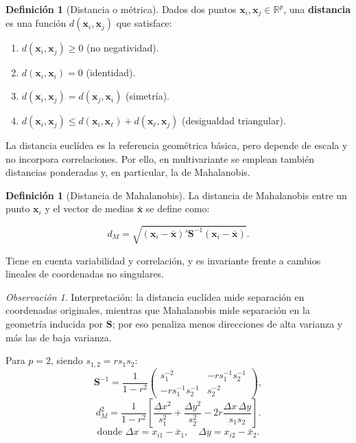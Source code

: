 \documentclass[12pt, a4paper]{article}
\theoremstyle{plain}
\theoremstyle{definition}
\newtheorem{definicion}[teorema]{Definición}
\theoremstyle{remark}
\newtheorem*{observacion}{Observación}
\newcommand{\R}{\mathbb{R}}
\newcommand{\mat}[1]{\mathbf{#1}}
\begin{document}
\begin{definicion}[Distancia o métrica]
Dados dos puntos $\mathbf{x}_i, \mathbf{x}_j\in\R^p$, una \textbf{distancia} es
una función $d(\mathbf{x}_i,\mathbf{x}_j)$ que satisface:
\begin{enumerate}
  \item $d(\mathbf{x}_i,\mathbf{x}_j)\ge0$ (no negatividad).
  \item $d(\mathbf{x}_i,\mathbf{x}_i)=0$ (identidad).
  \item $d(\mathbf{x}_i,\mathbf{x}_j)=d(\mathbf{x}_j,\mathbf{x}_i)$ (simetría).
  \item $d(\mathbf{x}_i,\mathbf{x}_j)\le d(\mathbf{x}_i,\mathbf{x}_\ell)+d(\mathbf{x}_\ell,\mathbf{x}_j)$ (desigualdad triangular).
\end{enumerate}
\end{definicion}

La distancia euclídea es la referencia geométrica básica, pero depende de
escala y no incorpora correlaciones. Por ello, en multivariante se emplean
también distancias ponderadas y, en particular, la de Mahalanobis.

\begin{definicion}[Distancia de Mahalanobis]
La distancia de Mahalanobis entre un punto $\mathbf{x}_i$ y el vector de
medias $\bar{\mathbf{x}}$ se define como:
\begin{mdframed}[style=resultado]
\[
  d_M = \sqrt{(\mathbf{x}_i-\bar{\mathbf{x}})'\mat{S}^{-1}(\mathbf{x}_i-\bar{\mathbf{x}})}.
\]
\end{mdframed}
Tiene en cuenta variabilidad y correlación, y es invariante frente a cambios
lineales de coordenadas no singulares.
\end{definicion}

\begin{observacion}
Interpretación: la distancia euclídea mide separación en coordenadas
originales, mientras que Mahalanobis mide separación en la geometría inducida
por $\mat{S}$; por eso penaliza menos direcciones de alta varianza y más las de
baja varianza.
\end{observacion}

Para $p=2$, siendo $s_{1,2}=rs_1s_2$:
\[
  \mat{S}^{-1} = \frac{1}{1-r^2}
  \begin{pmatrix}s_1^{-2}&-rs_1^{-1}s_2^{-1}\\-rs_1^{-1}s_2^{-1}&s_2^{-2}\end{pmatrix},
\]
\[
  d_M^2 = \frac{1}{1-r^2}\left[
    \frac{\Delta x^2}{s_1^2} + \frac{\Delta y^2}{s_2^2}
    - 2r\frac{\Delta x\,\Delta y}{s_1s_2}
  \right].
\]
\[
  \text{donde } \Delta x=x_{i1}-\bar{x}_1,\quad \Delta y=x_{i2}-\bar{x}_2.
\]
\end{document}
